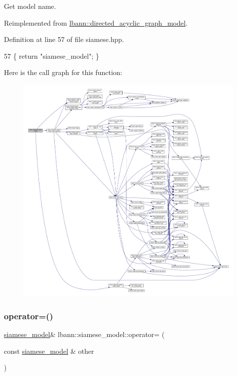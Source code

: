 Get model name. 

Reimplemented from \hyperlink{classlbann_1_1directed__acyclic__graph__model_ad2b97ab2670e76538a754e28e19b5c94}{lbann\+::directed\+\_\+acyclic\+\_\+graph\+\_\+model}.



Definition at line 57 of file siamese.\+hpp.


\begin{DoxyCode}
57 \{ \textcolor{keywordflow}{return} \textcolor{stringliteral}{"siamese\_model"}; \}
\end{DoxyCode}
Here is the call graph for this function\+:\nopagebreak
\begin{figure}[H]
\begin{center}
\leavevmode
\includegraphics[width=350pt]{classlbann_1_1siamese__model_ad745961977aa395e11543d263103126e_cgraph}
\end{center}
\end{figure}
\mbox{\label{classlbann_1_1siamese__model_a7651735d313d7625da89b290cb8e59ee}} 
\subsubsection{\texorpdfstring{operator=()}{operator=()}}
{\footnotesize\ttfamily \hyperlink{classlbann_1_1siamese__model}{siamese\+\_\+model}\& lbann\+::siamese\+\_\+model\+::operator= (\begin{DoxyParamCaption}\item[{const \hyperlink{classlbann_1_1siamese__model}{siamese\+\_\+model} \&}]{other }\end{DoxyParamCaption})\hspace{0.3cm}{\ttfamily [default]}}

